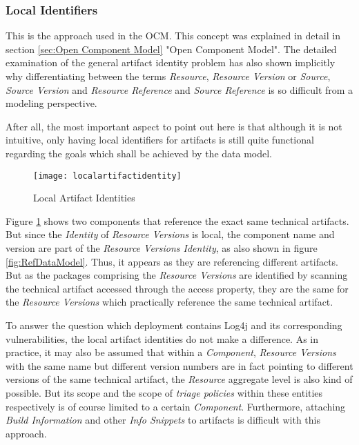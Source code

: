 \subsubsection{Local Identifiers}
This is the approach used in the OCM. This concept was explained in detail in section \ref{sec:Open Component Model} "Open Component Model". The detailed examination of the general artifact identity problem has also shown implicitly why differentiating between the terms \emph{Resource}, \emph{Resource Version} or \emph{Source}, \emph{Source Version} and \emph{Resource Reference} and \emph{Source Reference} is so difficult from a modeling perspective.\par
After all, the most important aspect to point out here is that although it is not intuitive, only having local identifiers for artifacts is still quite functional regarding the goals which shall be achieved by the data model. %

\begin{figure}[H]
	\centering
	\texttt{[image: localartifactidentity]}
	\caption[Local Artifact Identities]{Local Artifact Identities }
	\label{fig:LocalArtifactIdentity}
\end{figure}

Figure \ref{fig:LocalArtifactIdentity} shows two components that reference the exact same technical artifacts. But since the \emph{Identity} of \emph{Resource Versions} is local, the component name and version are part of the \emph{Resource Versions Identity}, as also shown in figure \ref{fig:RefDataModel}. Thus, it appears as they are referencing different artifacts. But as the packages comprising the \emph{Resource Versions} are identified by scanning the technical artifact accessed through the access property, they are the same for the \emph{Resource Versions} which practically reference the same technical artifact.\par 
To answer the question %
which deployment contains Log4j and its corresponding vulnerabilities, the local artifact identities do not make a difference. As in practice, it may also be assumed that within a \emph{Component}, \emph{Resource Versions} with the same name but different version numbers are in fact pointing to different versions of the same technical artifact, the \emph{Resource} aggregate level is also kind of possible. But its scope and the scope of \emph{triage policies} within these entities respectively is of course limited to a certain \emph{Component}. Furthermore, attaching \emph{Build Information} and other \emph{Info Snippets} to artifacts is difficult with this approach.


